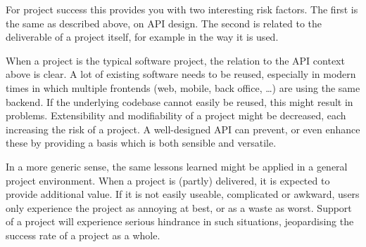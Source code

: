 \documentclass[]{uva-bachelor-thesis}
\def \CurrChapter {}
\def \CurrSection {}
\renewcommand{\chaptermark}[1]{\def \CurrChapter {#1} \def \CurrSection {}}
\begin{document}
For project success this provides you with two interesting risk factors. 
The first is the same as described above, on API design.
The second is related to the deliverable of a project itself, for example in the way it is used.

When a project is the typical software project, the relation to the API context above is clear. 
A lot of existing software needs to be reused, especially in modern times in which multiple frontends (web, mobile, back office, \ldots) are using the same backend. 
If the underlying codebase cannot easily be reused, this might result in problems. 
Extensibility and modifiability of a project might be decreased, each increasing the risk of a project. 
A well-designed API can prevent, or even enhance these by providing a basis which is both sensible and versatile.

In a more generic sense, the same lessons learned might be applied in a general project environment.
When a project is (partly) delivered, it is expected to provide additional value.
If it is not easily useable, complicated or awkward, users only experience the project as annoying at best, or as a waste as worst.
Support of a project will experience serious hindrance in such situations, jeopardising the success rate of a project as a whole.





\chaptermark{Bibliography}
\end{document}
